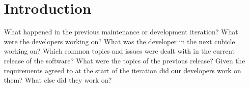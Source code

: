 \documentclass[times, 10pt,twocolumn]{article}
\newcommand{\lda}{Latent Dirichlet Allocation}
\newcommand{\shrinkit}{\vspace*{-.3em}}
\begin{document}
\begin{abstract}

\end{abstract}

\shrinkit
\section{Introduction}
\shrinkit



% 





What happened in the previous maintenance or development iteration? What were the developers
working on? What was the developer in the next cubicle working on?
Which common topics and issues were dealt with in the current
release of the software? What were the topics of the previous release?
Given the requirements agreed to at the start of the iteration did our
developers work on them? What else did they work on?

\end{document}
